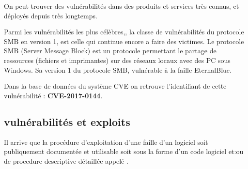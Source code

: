 
On peut trouver des vulnérabilités dans des produits et services très connus, et déployés depuis très longtemps.


Parmi les vulnérabilités les plus célèbres,, la classe de vulnérabilités du protocole SMB en version 1, est celle qui continue encore a faire des victimes.
Le protocole SMB (Server Message Block) est un protocole permettant le partage de ressources (fichiers et imprimantes) sur des réseaux locaux avec des PC sous Windows. Sa version 1 du protocole SMB, vulnérable à la faille EternalBlue.

Dans la base de données du système CVE on retrouve l’identifiant de cette vulnérabilité : \textbf{CVE-2017-0144}. 


\subsection{vulnérabilités et exploits}

Il arrive que la procédure d'exploitation d'une faille d'un logiciel soit publiquement documentée et utilisable soit sous la forme d'un code logiciel et:ou de procedure descriptive détaillée appelé .



